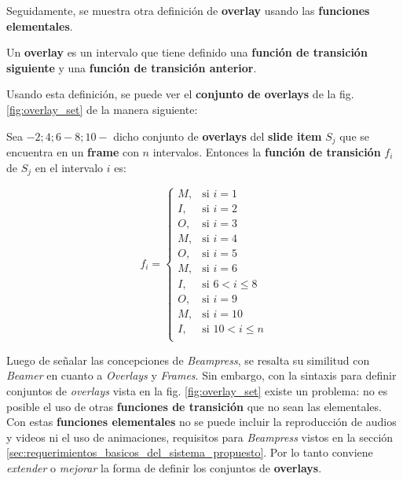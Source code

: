 		Seguidamente, se muestra otra definición de \textbf{overlay} usando las \textbf{funciones elementales}.

		\begin{definition}
		\label{def:new_overlay}

 			Un \textbf{overlay} es un intervalo que tiene definido una \textbf{función de transición siguiente} y una \textbf{función de transición anterior}.

		\end{definition}

		Usando esta definición, se puede ver el \textbf{conjunto de overlays} de la fig. \ref{fig:overlay_set} de la manera siguiente:


		Sea \(-2; 4; 6-8; 10-\) dicho conjunto de \textbf{overlays} del \textbf{slide item} \( S_j \) que se encuentra en un \textbf{frame} con \( n \) intervalos. Entonces la \textbf{función de transición} \( f_i \) de \( S_j \) en el intervalo \( i \) es:

		\begin{equation}
		\label{eq:example}
			f_i = 
			\begin{cases}
				M, & \mbox{si }i = 1 \\
				I, & \mbox{si }i = 2  \\
				O, & \mbox{si }i = 3  \\
				M, & \mbox{si }i = 4  \\
				O, & \mbox{si }i = 5  \\
				M, & \mbox{si }i = 6  \\
				I, & \mbox{si } 6 < i \leq 8  \\
				O, & \mbox{si }i = 9  \\
				M, & \mbox{si }i = 10  \\
				I, & \mbox{si } 10 < i \leq n  \\
			\end{cases}
		\end{equation}




	Luego de señalar las concepciones de \textit{Beampress}, se resalta su similitud con \textit{Beamer} en cuanto a \textit{Overlays} y \textit{Frames}. Sin embargo, con la sintaxis para definir conjuntos de \textit{overlays} vista en la fig. \ref{fig:overlay_set} existe un problema: no es posible el uso de otras	\textbf{funciones de transición} que no sean las elementales. Con estas \textbf{funciones elementales} no se puede incluir la reproducción de audios y videos ni el uso de animaciones, requisitos para \textit{Beampress} vistos en la sección \ref{sec:requerimientos_basicos_del_sistema_propuesto}.	Por lo tanto conviene \textit{extender} o \textit{mejorar} la forma de definir los conjuntos de \textbf{overlays}.




